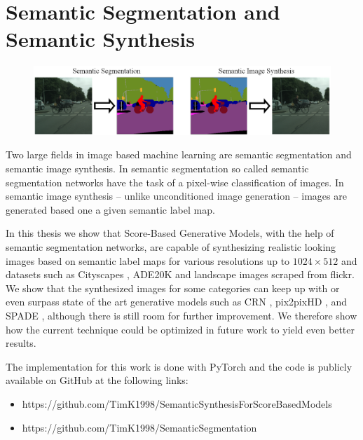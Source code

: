 \section{Semantic Segmentation and Semantic Synthesis} 
\thispagestyle{plain}
%
\begin{figure}[h!]
    \centering
    \includegraphics[width=1\textwidth]{Chapters/figures/sem_seg_vs_sem_synth.PNG}
\end{figure}
%
Two large fields in image based machine learning are semantic segmentation and semantic image synthesis. In semantic segmentation so called semantic segmentation networks have the task of a pixel-wise classification of images. In semantic image synthesis – unlike unconditioned image generation \cite{score_3} – images are generated based one a given semantic label map.

In this thesis we show that Score-Based Generative Models, with the help of semantic segmentation networks, are capable of synthesizing realistic looking images based on semantic label maps for various resolutions up to $1024\times512$ and datasets such as Cityscapes \cite{cityscapes}, ADE20K \cite{ade20k} and landscape images scraped from flickr. We show that the synthesized images for some categories can keep up with or even surpass state of the art generative models such as CRN \cite{crn}, pix2pixHD \cite{pix2pixHD}, and SPADE \cite{spade}, although there is still room for further improvement. We therefore show how the current technique could be optimized in future work to yield even better results. 

The implementation for this work is done with PyTorch and the code is publicly available on GitHub at the following links: 
\begin{itemize}
    \item https://github.com/TimK1998/SemanticSynthesisForScoreBasedModels
    \item https://github.com/TimK1998/SemanticSegmentation
\end{itemize}

